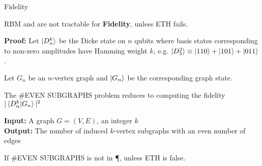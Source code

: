 \begin{refsection}
\begin{frame}{Fidelity}
	\begin{theorem}
		RBM and \limdd are not tractable for \textbf{Fidelity}, unless ETH fails.
	\end{theorem}

\pause

\textbf{Proof:}
Let $\ket{D^k_n}$ be the Dicke state on $n$ qubits where basis states corresponding to  non-zero amplitudes have Hamming weight $k$, e.g. $\ket{D^2_3} \equiv \ket{110} + \ket{101} + \ket{011}$.


\pause

Let $G_n$ be an $n$-vertex graph and $\ket{G_n}$ be the corresponding graph state.

\pause

\alert{The \#EVEN SUBGRAPHS problem reduces to computing the fidelity $|\braket{D^k_n| G_n}|^2$}


\begin{definition}
	\textbf{Input:} A graph $G=(V,E)$, an integer $k$\\
	\textbf{Output:} The number of induced $k$-vertex subgraphs with an even number of edges
\end{definition}


\pause

\begin{theorem}
	\label{thm:even-subgraphs-ETH-hard}
	If \#EVEN SUBGRAPHS is not in \P, unless ETH is false.
\end{theorem}


\printbibliography[section=\therefsection]

\end{frame}
\end{refsection}





